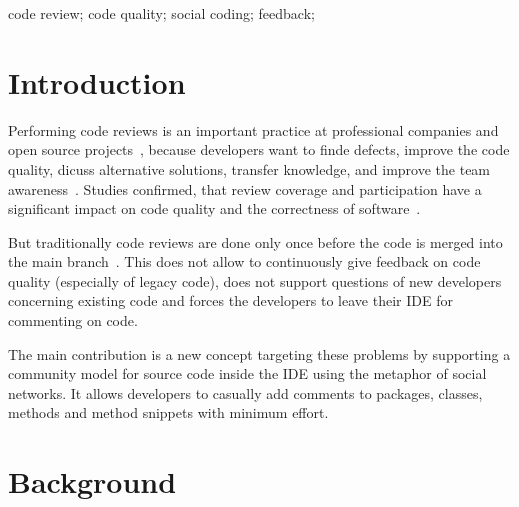\documentclass[10pt, conference]{IEEEtran}
\begin{document}
\begin{IEEEkeywords}
code review; code quality; social coding; feedback;

\end{IEEEkeywords}


%
\IEEEpeerreviewmaketitle

\section{Introduction}
Performing code reviews is an important practice at professional companies and open source projects~\cite{balachandran2013PeerCodeReviews, bird2015CodeReviewPlatform, rigby2013PeerCodeReviews, czerwonka2015codereviews}, because developers want to finde defects, improve the code quality, dicuss alternative solutions, transfer knowledge, and improve the team awareness~\cite{rigby2013PeerCodeReviews, bacchelli2013expectations}.
%
Studies confirmed, that review coverage and participation have a significant impact on code quality and the correctness of software~\cite{mcintosh2014impact, thongtanunam2015CodeReviews, shimagaki2016CRInSony}. 
%

%
But traditionally code reviews are done only once before the code is merged into the main branch~\cite{rigby2013PeerCodeReviews}. 
%
This does not allow to continuously give feedback on code quality (especially of legacy code), does not support questions of new developers concerning existing code and forces the developers to leave their IDE for commenting on code.
%

%
The main contribution is a new concept targeting these problems by supporting a community model for source code inside the IDE using the metaphor of social networks.
%
It allows developers to casually add comments to packages, classes, methods and method snippets with minimum effort.

\section{Background}
\end{document}

